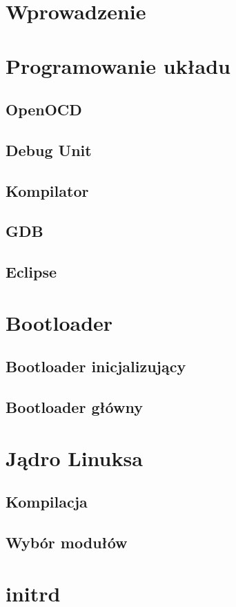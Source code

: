 \documentclass[a4paper]{report}
\begin{document}
		\section{Wprowadzenie}
		\section{Programowanie układu}
			\subsection{OpenOCD}
			\subsection{Debug Unit}
			\subsection{Kompilator}
			\subsection{GDB}
			\subsection{Eclipse}
		\section{Bootloader}
			\subsection{Bootloader inicjalizujący}
			\subsection{Bootloader główny}
		\section{Jądro Linuksa}
			\subsection{Kompilacja}
			\subsection{Wybór modułów}
		\section{initrd}
\end{document}
